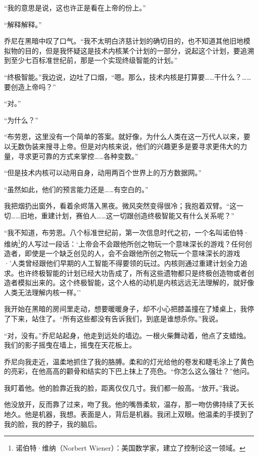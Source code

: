 \documentclass[AutoFakeBold=true]{book}
\begin{document}
``我的意思是说，这也许正是看在上帝的份上。''

``解释解释。''

乔尼在黑暗中叹了口气。``我不太明白济慈计划的确切目的，也不知道其他旧地模拟物的目的，但是我怀疑这是技术内核某个计划的一部分，说起这个计划，要追溯到至少七百标准世纪前，那是一个实现终级智能的计划。''

``终极智能。''我边说，边吐了口烟，``嗯。那么，技术内核是打算要……干什么？……要创造上帝吗？''

``对。''

``为什么？''

``布劳恩，这里没有一个简单的答案。就好像，为什么人类在这一万代人以来，要以无数伪装来搜寻上帝。但是对内核来说，他们的兴趣更多是要寻求更伟大的力量，寻求更可靠的方式来掌控……各种变数。''

``但是技术内核可以动用自身，动用两百个世界上的万方数据网。''

``虽然如此，他们的预言能力还是……有空白的。''

我把烟扔出窗外，看着余烬落入黑夜。微风突然变得很冷；我抱着双臂。``这一切……旧地，重建计划，赛伯人……这一切跟创造终极智能又有什么关系呢？''

``我不知道，布劳恩。八个标准世纪前，第一次信息时代之初，一个名叫诺伯特·维纳\footnote{诺伯特·维纳（Norbert Wiener）：美国数学家，建立了控制论这一领域。}的人写过一段话：`上帝会不会跟他所创之物玩一个意味深长的游戏？任何创造者，即使是一个缺乏创见的人，会不会跟他所创之物玩一个意味深长的游戏·'人类曾经跟他们早期的人工智能不得要领的玩过。内核则通过重建计划全力追求。也许终极智能的计划已经大功告成了，所有这些遗物都只是终极创造物或者创造者模拟出来的。这个终极智能，这个人格的动机是内核远远无法理解的，就好像人类无法理解内核一样。''

我开始在黑暗的房间里走动，想要暖暖身子，却不小心把膝盖撞在了矮桌上，我停了下来，站住了。``所有这些都没有告诉我们，到底是谁想杀你。''我说。

``对，没有。''乔尼站起身，他走到远处的墙边。一根火柴舞动着，他点了支蜡烛。我们的影子摇曳在墙上，摇曳在天花板上。

乔尼向我走近，温柔地抓住了我的胳膊。柔和的灯光给他的卷发和睫毛涂上了黄色的亮彩，在他高高的颧骨和结实的下巴上抹上了亮色。``你怎么这么强壮？''他问。

我盯着他。他的脸靠近我的脸，距离仅仅几寸。我们都一般高。``放开。''我说。

他没放开，反而靠了过来，吻了我。他的嘴唇柔软，温存，那一吻仿佛持续了天长地久。他是机器，我想。表面是人，背后是机器。我闭上双眼。他温柔的手摸到了我的脸，我的脖子，我的脑后。
\end{document}
